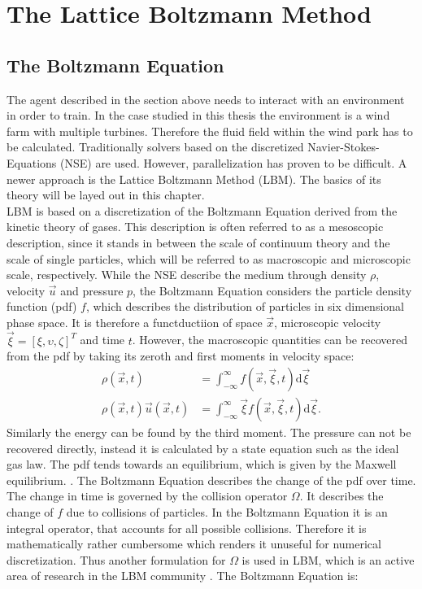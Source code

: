 \section{The Lattice Boltzmann Method}
\label{sec:LBM}
\subsection{The Boltzmann Equation}
The agent described in the section above needs to interact with an environment in order to train. In the case studied in this thesis the environment is a wind farm with multiple turbines. Therefore the fluid field within the wind park has to be calculated.
Traditionally solvers based on the discretized Navier-Stokes-Equations (NSE) are used. However, parallelization has proven to be difficult. A newer approach is the Lattice Boltzmann Method (LBM). The basics of its theory will be layed out in this chapter. \\
LBM is based on a discretization of the Boltzmann Equation derived from the kinetic theory of gases. This description is often referred to as a mesoscopic description, since it stands in  between the scale of continuum theory and the scale of single particles, which will be referred to as macroscopic and microscopic scale, respectively. While the NSE describe the medium through density $\rho$, velocity $\vec{u}$ and pressure $p$, the Boltzmann Equation considers the particle density function (pdf) $f$, which describes the distribution of particles in six dimensional phase space. It is therefore a functductiion of space $\vec{x}$, microscopic velocity $\vec{\xi} = [\xi, \upsilon, \zeta]^T$ and time $t$. However, the macroscopic quantities can be recovered from the pdf by taking its zeroth and first moments in velocity space:
\begin{align}
	\rho(\vec{x}, t) &= \int_{-\infty}^{\infty} f(\vec{x}, \vec{\xi}, t) \mathrm{d}\vec{\xi} \label{eq:rho} \\
	\rho(\vec{x}, t) \vec{u}(\vec{x}, t) &= \int_{-\infty}^{\infty} \vec{\xi} f(\vec{x}, \vec{\xi}, t) \mathrm{d}\vec{\xi}. \label{eq:velocity}
\end{align}
Similarly the energy can be found by the third moment. The pressure can not be recovered directly, instead it is calculated by a state equation such as the ideal gas law. The pdf tends towards an equilibrium, which is given by the Maxwell equilibrium. .
The Boltzmann Equation describes the change of the pdf over time. The change in time is governed by the collision operator $\Omega$. It describes the change of $f$ due to collisions of particles. In the Boltzmann Equation it is an integral operator, that accounts for all possible collisions. Therefore it is mathematically rather cumbersome which renders it unuseful for numerical discretization. Thus another formulation for $\Omega$ is used in LBM, which is an active area of research in the LBM community \cite{coreixas_comprehensive_2019}. The Boltzmann Equation is:
